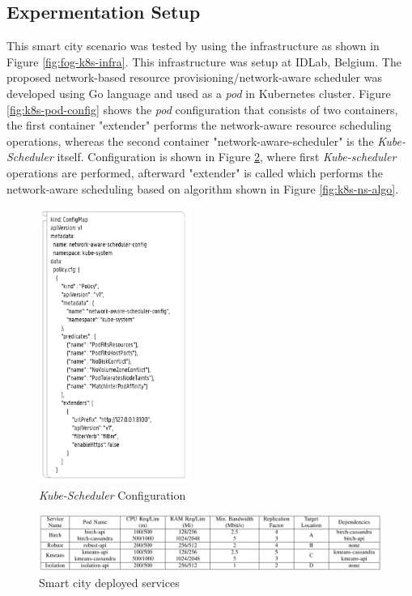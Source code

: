 \subsection{Expermentation Setup}
\label{sec:setup}
This smart city scenario was tested by using the infrastructure as shown in Figure \ref{fig:fog-k8s-infra}. This infrastructure was setup at IDLab, Belgium\cite{Santos2019}. The proposed network-based resource provisioning/network-aware scheduler was developed using Go language and used as a \emph{pod} in Kubernetes cluster\cite{Santos2019}. Figure \ref{fig:k8s-pod-config} shows the \emph{pod} configuration that consists of two containers, the first container "extender" performs the network-aware resource scheduling operations, whereas the second container "network-aware-scheduler" is the \emph{Kube-Scheduler} itself\cite{Santos2019}. Configuration is shown in Figure \ref{fig:k8s-sch-config}, where first \emph{Kube-scheduler} operations are performed, afterward "extender" is called which performs the network-aware scheduling based on algorithm\cite{Santos2019} shown in Figure \ref{fig:k8s-ns-algo}. \par
\begin{figure}
  \centering
  \includegraphics[width=\linewidth, height=9cm]{figures/mlcn-k8s-scheduler-config.pdf}
  \caption{\emph{Kube-Scheduler} Configuration\cite{Santos2019}}
  \label{fig:k8s-sch-config}
\end{figure}
\begin{figure}
  \includegraphics[width=\linewidth]{figures/mlcn-k8s-service-pods.pdf}
  \caption{Smart city deployed services\cite{Santos2019}}
  \label{fig:k8s-sch-config}
\end{figure}
